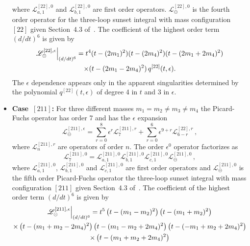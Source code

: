 \documentclass[a4paper,12pt]{article}
\numberwithin{equation}{section}
\numberwithin{figure}{section}
\def\su{\circleddash}
\begin{document}
\begin{itemize}
       where  $ \mathscr{L}^{[22],0}_{a,1}$ and $
       \mathscr{L}^{[22],0}_{b,1}$ are first order operators. 
        $\mathscr{L}^{[22],0}_\su$ is the fourth order operator for the
       three-loop sunset integral with mass configuration $[22]$ given  Section~4.3 of~\cite{Lairez:2022zkj}.
    The coefficient of the highest order term $(d/dt)^6$    is given by
       \begin{multline}
                   \mathscr{L}^{[22],\epsilon}_\su\Big\vert_{(d/dt)^6}=
                   t^4(t-(2m_1)^2)(t-(2m_4)^2)(t-(2m_1+2m_4)^2)\cr\times(t-(2m_1-2m_4)^2)
                   \, q^{[22]}(t,\epsilon).
                 \end{multline}
                 The $\epsilon$ dependence appears only in the
                 apparent singularities determined by the polynomial
                 $q^{[22]}(t,\epsilon)$ of degree 4 in $t$ and $3$ in $\epsilon$.
     \item   {\bf Case~$[211]$:} For three different masses $m_1=m_2\neq m_3 \neq m_4$ the
  Picard-Fuchs operator has order 7 and has the $\epsilon$ expansion
  \begin{equation}
    \mathscr{L}^{[211],\epsilon}_\su=       \sum_{r=0}^8 \epsilon^r
    \mathscr{L}^{[211],r}_{7}+  \sum_{r=0}^6 \epsilon^{9+r}   \mathscr{L}^{[22],r}_{6-r} \,,
  \end{equation}
   where  $ \mathscr{L}^{[211],r}_{n}$ 
  are operators of order $n$.
    The order $\epsilon^0$ operator factorizes as
  \begin{equation}
         \mathscr{L}^{[211],0}_{7}=   \mathscr{L}^{[211],0}_{a,1}  \mathscr{L}^{[211],0}_{b,1} \mathscr{L}^{[211],0}_{c,1}\mathscr{L}^{[211],0}_\su \,,
       \end{equation}
        where  $ \mathscr{L}^{[211],0}_{a,1}$,  $
        \mathscr{L}^{[211],0}_{b,1}$ and  $ \mathscr{L}^{[211],0}_{c,1}$ are  first order operators
       and $\mathscr{L}^{[211],0}_\su$ is the fifth order Picard-Fuchs operator the
       three-loop sunset integral with mass configuration $[211]$
       given Section~4.3 of~\cite{Lairez:2022zkj}.   The coefficient of the highest order term $(d/dt)^6$    is given by
       \begin{multline}
                   \mathscr{L}^{[211],\epsilon}_\su\Big\vert_{(d/dt)^6}=
                   t^5\left(t-(m_{1}-m_{2})^2\right) \left(t-(m_{1}+m_{2})^2\right)\cr\times
   \left(t-(m_{1}+m_{2}-2 m_{4})^2\right) \left(t-(m_{1}-m_{2}+2
   m_{4})^2\right) \left(t-(-m_{1}+m_{2}+2 m_{4})^2\right)\cr\times
   \left(t-(m_{1}+m_{2}+2 m_{4})^2\right)

\end{multline}
\end{itemize}
\end{document}
